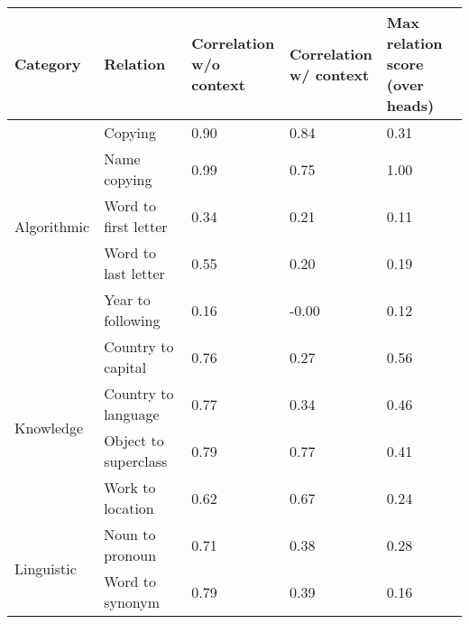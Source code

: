 \begin{tabular}{lllll}
\toprule
Category & Relation & \makecell{Correlation\\w/o context} & \makecell{Correlation\\w/ context} & \makecell{Max relation score\\(over heads)} \\
\midrule
\multirow{5}{*}{Algorithmic} & Copying & 0.90 & 0.84 & 0.31 \\
 & Name copying & 0.99 & 0.75 & 1.00 \\
 & Word to first letter & 0.34 & 0.21 & 0.11 \\
 & Word to last letter & 0.55 & 0.20 & 0.19 \\
 & Year to following & 0.16 & -0.00 & 0.12 \\
\multirow{4}{*}{Knowledge} & Country to capital & 0.76 & 0.27 & 0.56 \\
 & Country to language & 0.77 & 0.34 & 0.46 \\
 & Object to superclass & 0.79 & 0.77 & 0.41 \\
 & Work to location & 0.62 & 0.67 & 0.24 \\
\multirow{2}{*}{Linguistic} & Noun to pronoun & 0.71 & 0.38 & 0.28 \\
 & Word to synonym & 0.79 & 0.39 & 0.16 \\
\bottomrule
\end{tabular}
